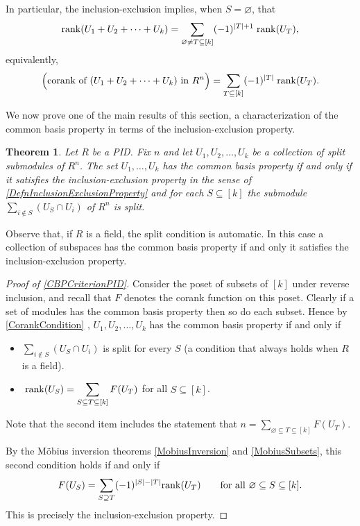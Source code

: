 \documentclass[a4paper]{amsart}
\numberwithin{theoremcounter}{section}
\newtheorem{theorem}[theoremauto]{Theorem}
\theoremstyle{definition}
\theoremstyle{remark}
\newcommand{\mr}[1]{{\rm #1}}
\newcommand{\rank}{\mr{rank}}
\begin{document}
In particular, the inclusion-exclusion implies, when $S=\varnothing$, that
$$ \rank(U_1 + U_2 + \dots +  U_k) = \sum_{\varnothing \neq T \subseteq [k]} (-1)^{|T|+1} \; \rank(U_T),$$ equivalently,   
$$ \Big(\text{corank of $(U_1 + U_2 + \dots +  U_k)$ in $R^n$}\Big)  = \sum_{T \subseteq [k]} (-1)^{|T|} \; \rank(U_T).$$

We now prove one of the main results of this section, a characterization of the common basis property in terms of the inclusion-exclusion property. 

\begin{theorem} \label{CBPCriterionPID} Let $R$ be a PID. Fix $n$ and let $U_1, U_2, \dots, U_k$ be a collection of split submodules of $R^n$.  The set $U_1, \dots, U_k$ has the common basis property if and only if it satisfies the inclusion-exclusion property in the sense  of \autoref{DefnInclusionExclusionProperty} and for each $S \subseteq [k]$ the submodule $\sum_{i \notin S} (U_S \cap U_i)$ of $R^n$ is split. 
\end{theorem} 

Observe that, if $R$ is a field, the split condition is automatic. In this case a collection of subspaces has the common basis property if and only it satisfies the inclusion-exclusion property. 

\begin{proof}[Proof of \autoref{CBPCriterionPID}] Consider the poset of subsets of $[k]$ under reverse inclusion, and recall that $F$ denotes the corank function on this poset.  Clearly if a set of modules has the common basis property then so do each subset. 
 Hence by \autoref{CorankCondition}
, $U_1, U_2, \dots, U_k$ has the common basis property if and only if 
\begin{itemize}
\item $\sum_{i \notin S} (U_S \cap U_i)$  is split for every $S$ (a condition that always holds when $R$ is a field). \\

\item   $ \displaystyle \; \rank(U_S) = \sum_{S \subseteq T \subseteq [k]} F(U_T)$ for all $S \subseteq [k]$.
\end{itemize} 
Note that the second item includes the statement that $\displaystyle n =  \sum_{\varnothing \subseteq T \subseteq [k]} F(U_T)$. 


By the M\"obius inversion theorems \autoref{MobiusInversion} and \autoref{MobiusSubsets}, this second condition holds if and only if 
$$ F(U_S) = \sum_{S \supseteq T} (-1)^{|S|-|T|} \rank(U_T) \qquad \text{for all $ \varnothing \subseteq S \subseteq [k].$}$$
This is precisely the inclusion-exclusion property. 
\end{proof} 
\end{document}
